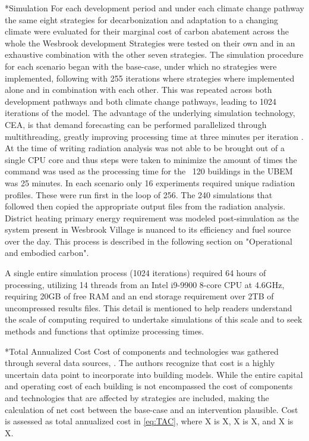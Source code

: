\documentclass[twocolumn, a4paper,10pt]{article}
\makeatletter
\renewcommand\subsection{\@startsection{subsection}{1}{\z@}{\z@}{\z@}{\normalfont\normalsize\bfseries}}
\renewcommand\subsection{\@startsection{subsection}{1}{\z@}{\z@}{0.1pt}{\normalfont\normalsize\bfseries}}
\makeatother
\begin{document}
\subsection*{Simulation}
For each development period and under each climate change pathway the same eight strategies for decarbonization and adaptation to a changing climate were evaluated for their marginal cost of carbon abatement across the whole the Wesbrook development Strategies were tested on their own and in an exhaustive combination with the other seven strategies. The simulation procedure for each scenario began with the base-case, under which no strategies were implemented, following with 255 iterations where strategies where implemented alone and in combination with each other. This was repeated across both development pathways and both climate change pathways, leading to 1024 iterations of the model. The advantage of the underlying simulation technology, CEA, is that demand forecasting can be performed parallelized through multithreading, greatly improving processing time at three minutes per iteration \citep{mckerns}. At the time of writing radiation analysis was not able to be brought out of a single CPU core and thus steps were taken to minimize the amount of times the command was used as the processing time for the ~120 buildings in the UBEM was 25 minutes. In each scenario only 16 experiments required unique radiation profiles. These were run first in the loop of 256. The 240 simulations that followed then copied the appropriate output files from the radiation analysis. District heating primary energy requirement was modeled post-simulation as the system present in Wesbrook Village is nuanced to its efficiency and fuel source over the day. This process is described in the following section on "Operational and embodied carbon". 

A single entire simulation process (1024 iterations) required 64 hours of processing, utilizing 14 threads from an Intel i9-9900 8-core CPU at 4.6GHz, requiring 20GB of free RAM and an end storage requirement over 2TB of uncompressed results files. This detail is mentioned to help readers understand the scale of computing required to undertake simulations of this scale and to seek methods and functions that optimize processing times. 

\subsection*{Total Annualized Cost}
Cost of components and technologies was gathered through several data sources, \citep{rs means; corix cpcn; ctbuh 3for2; kegal; salasobich}. The authors recognize that cost is a highly uncertain data point to incorporate into building models. While the entire capital and operating cost of each building is not encompassed the cost of components and technologies that are affected by strategies are included, making the calculation of net cost between the base-case and an intervention plausible. Cost is assessed as total annualized cost in \ref{eq:TAC}, where X is X, X is X, and X is X.
\end{document}
